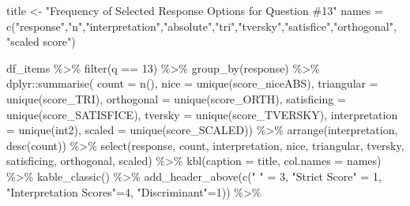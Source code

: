 \documentclass[
  letterpaper,
  DIV=11,
  numbers=noendperiod]{scrreprt}
\newenvironment{Shaded}{\begin{snugshade}}{\end{snugshade}}
\newcommand{\AttributeTok}[1]{\textcolor[rgb]{0.40,0.45,0.13}{#1}}
\newcommand{\DecValTok}[1]{\textcolor[rgb]{0.68,0.00,0.00}{#1}}
\newcommand{\FunctionTok}[1]{\textcolor[rgb]{0.28,0.35,0.67}{#1}}
\newcommand{\NormalTok}[1]{\textcolor[rgb]{0.00,0.23,0.31}{#1}}
\newcommand{\OtherTok}[1]{\textcolor[rgb]{0.00,0.23,0.31}{#1}}
\newcommand{\SpecialCharTok}[1]{\textcolor[rgb]{0.37,0.37,0.37}{#1}}
\newcommand{\StringTok}[1]{\textcolor[rgb]{0.13,0.47,0.30}{#1}}
\begin{document}
\begin{Shaded}
\begin{Highlighting}[]
\NormalTok{title }\OtherTok{\textless{}{-}} \StringTok{"Frequency of Selected Response Options for Question \#13"}
\NormalTok{names }\OtherTok{=} \FunctionTok{c}\NormalTok{(}\StringTok{"response"}\NormalTok{,}\StringTok{"n"}\NormalTok{,}\StringTok{"interpretation"}\NormalTok{,}\StringTok{"absolute"}\NormalTok{,}\StringTok{"tri"}\NormalTok{,}\StringTok{"tversky"}\NormalTok{,}\StringTok{"satisfice"}\NormalTok{,}\StringTok{"orthogonal"}\NormalTok{, }\StringTok{"scaled score"}\NormalTok{)}

\NormalTok{df\_items }\SpecialCharTok{\%\textgreater{}\%} \FunctionTok{filter}\NormalTok{(q }\SpecialCharTok{==} \DecValTok{13}\NormalTok{) }\SpecialCharTok{\%\textgreater{}\%} \FunctionTok{group\_by}\NormalTok{(response) }\SpecialCharTok{\%\textgreater{}\%}
\NormalTok{  dplyr}\SpecialCharTok{::}\FunctionTok{summarise}\NormalTok{( }\AttributeTok{count =} \FunctionTok{n}\NormalTok{(),}
                    \AttributeTok{nice =} \FunctionTok{unique}\NormalTok{(score\_niceABS),}
                    \AttributeTok{triangular =} \FunctionTok{unique}\NormalTok{(score\_TRI),}
                    \AttributeTok{orthogonal =}  \FunctionTok{unique}\NormalTok{(score\_ORTH),}
                    \AttributeTok{satisficing =}  \FunctionTok{unique}\NormalTok{(score\_SATISFICE),}
                    \AttributeTok{tversky =} \FunctionTok{unique}\NormalTok{(score\_TVERSKY),}
                    \AttributeTok{interpretation =} \FunctionTok{unique}\NormalTok{(int2),}
                    \AttributeTok{scaled =} \FunctionTok{unique}\NormalTok{(score\_SCALED)) }\SpecialCharTok{\%\textgreater{}\%}
  \FunctionTok{arrange}\NormalTok{(interpretation, }\FunctionTok{desc}\NormalTok{(count)) }\SpecialCharTok{\%\textgreater{}\%}
  \FunctionTok{select}\NormalTok{(response, count, interpretation, nice,}
\NormalTok{         triangular, tversky, satisficing, orthogonal, scaled) }\SpecialCharTok{\%\textgreater{}\%}
  \FunctionTok{kbl}\NormalTok{(}\AttributeTok{caption =}\NormalTok{ title, }\AttributeTok{col.names =}\NormalTok{ names) }\SpecialCharTok{\%\textgreater{}\%}  \FunctionTok{kable\_classic}\NormalTok{() }\SpecialCharTok{\%\textgreater{}\%}
  \FunctionTok{add\_header\_above}\NormalTok{(}\FunctionTok{c}\NormalTok{(}\StringTok{" "} \OtherTok{=} \DecValTok{3}\NormalTok{, }\StringTok{"Strict Score"} \OtherTok{=} \DecValTok{1}\NormalTok{, }\StringTok{"Interpretation Scores"}\OtherTok{=}\DecValTok{4}\NormalTok{, }\StringTok{"Discriminant"}\OtherTok{=}\DecValTok{1}\NormalTok{)) }\SpecialCharTok{\%\textgreater{}\%}

\end{Highlighting}
\end{Shaded}
\end{document}
